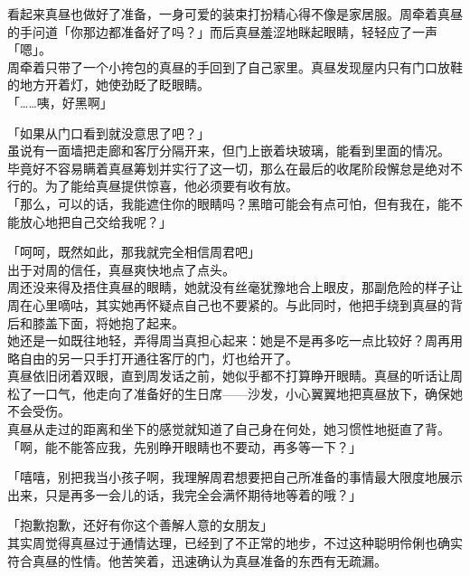 看起来真昼也做好了准备，一身可爱的装束打扮精心得不像是家居服。周牵着真昼的手问道「你那边都准备好了吗？」而后真昼羞涩地眯起眼睛，轻轻应了一声「嗯」。\\

周牵着只带了一个小挎包的真昼的手回到了自己家里。真昼发现屋内只有门口放鞋的地方开着灯，她使劲眨了眨眼睛。\\

「……咦，好黑啊」

「如果从门口看到就没意思了吧？」\\

虽说有一面墙把走廊和客厅分隔开来，但门上嵌着块玻璃，能看到里面的情况。\\

毕竟好不容易瞒着真昼筹划并实行了这一切，那么在最后的收尾阶段懈怠是绝对不行的。为了能给真昼提供惊喜，他必须要有收有放。\\

「那么，可以的话，我能遮住你的眼睛吗？黑暗可能会有点可怕，但有我在，能不能放心地把自己交给我呢？」

「呵呵，既然如此，那我就完全相信周君吧」\\

出于对周的信任，真昼爽快地点了点头。\\

周还没来得及捂住真昼的眼睛，她就没有丝毫犹豫地合上眼皮，那副危险的样子让周在心里嘀咕，其实她再怀疑点自己也不要紧的。与此同时，他把手绕到真昼的背后和膝盖下面，将她抱了起来。\\

她还是一如既往地轻，弄得周当真担心起来：她是不是再多吃一点比较好？周再用略自由的另一只手打开通往客厅的门，灯也给开了。\\

真昼依旧闭着双眼，直到周发话之前，她似乎都不打算睁开眼睛。真昼的听话让周松了一口气，他走向了准备好的生日席——沙发，小心翼翼地把真昼放下，确保她不会受伤。\\

真昼从走过的距离和坐下的感觉就知道了自己身在何处，她习惯性地挺直了背。\\

「啊，能不能答应我，先别睁开眼睛也不要动，再多等一下？」

「嘻嘻，别把我当小孩子啊，我理解周君想要把自己所准备的事情最大限度地展示出来，只是再多一会儿的话，我完全会满怀期待地等着的哦？」

「抱歉抱歉，还好有你这个善解人意的女朋友」\\

其实周觉得真昼过于通情达理，已经到了不正常的地步，不过这种聪明伶俐也确实符合真昼的性情。他苦笑着，迅速确认为真昼准备的东西有无疏漏。\\

